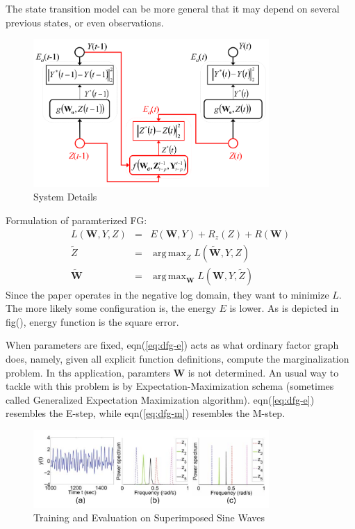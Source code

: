 \documentclass[11pt,a4paper]{article}
\DeclareMathOperator*{\argmax}{arg\,max}
\begin{document}
The state transition model can be more general that it may depend
on several previous states, or even observations. 

\begin{figure}[htb]
\centering
	\includegraphics[width=0.8\textwidth]{fig/mirowski2009-detail.png}
	\caption{System Details}
\end{figure}

Formulation of paramterized FG:
\begin{eqnarray}
	L(\mathbf{W}, Y, Z) &=& E(\mathbf{W}, Y) + R_z(Z) + R(\mathbf{W}) \\
	\tilde{Z} &=& \argmax_{Z} L(\tilde{\mathbf{W}}, Y, Z) \label{eq:dfg-e}\\
	\tilde{\mathbf{W}} &=& \argmax_{\mathbf{W}} L(\mathbf{W}, Y, \tilde{Z})
	\label{eq:dfg-m}
\end{eqnarray}
Since the paper operates in the negative log domain, they want to minimize
$L$. The more likely some configuration is, the energy $E$ is lower. As is 
depicted in fig(), energy function is the square error. 

When parameters are fixed, eqn(\ref{eq:dfg-e}) acts as what ordinary 
factor graph does, namely, given all explicit function definitions, 
compute the marginalization problem. In ths application, paramters $\mathbf{W}$
is not determined. An usual way to tackle with this problem is 
by Expectation-Maximization schema (sometimes called Generalized Expectation 
Maximization algorithm). eqn(\ref{eq:dfg-e}) resembles the E-step, while 
eqn(\ref{eq:dfg-m}) resembles the M-step. 

\begin{figure}[htb]
\centering
	\includegraphics[width=0.8\textwidth]{fig/mirowski2009-sine.png}
	\caption{Training and Evaluation on Superimposed Sine Waves}
\end{figure}
\end{document}
